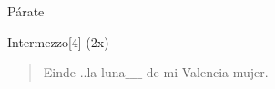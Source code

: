 \begin{song}{Párate}
\begin{instrumental}{Intermezzo}[4]
  \measure{} \measure{}
    (2x)
\end{instrumental}


\begin{verse}{Einde}
\chord{(*)}..la luna$\_\_\_$$\_$ de mi Valencia mujer.  \hspace{0.8em} \hspace{1.3em} 
\end{verse}
\end{song}
